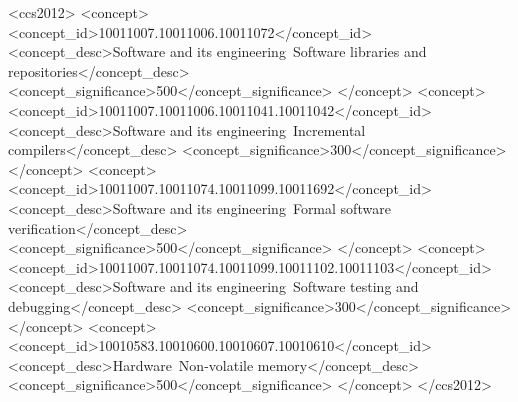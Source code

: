 \documentclass[sigconf]{acmart}
\theoremstyle{invar}
\begin{document}
\title{\papertitle}

\author{Morteza Hoseinzadeh}

\author{Steven Swanson}








\begin{CCSXML}
<ccs2012>
    <concept>
        <concept_id>10011007.10011006.10011072</concept_id>
        <concept_desc>Software and its engineering~Software libraries and repositories</concept_desc>
        <concept_significance>500</concept_significance>
        </concept>
    <concept>
        <concept_id>10011007.10011006.10011041.10011042</concept_id>
        <concept_desc>Software and its engineering~Incremental compilers</concept_desc>
        <concept_significance>300</concept_significance>
        </concept>
    <concept>
        <concept_id>10011007.10011074.10011099.10011692</concept_id>
        <concept_desc>Software and its engineering~Formal software verification</concept_desc>
        <concept_significance>500</concept_significance>
        </concept>
    <concept>
        <concept_id>10011007.10011074.10011099.10011102.10011103</concept_id>
        <concept_desc>Software and its engineering~Software testing and debugging</concept_desc>
        <concept_significance>300</concept_significance>
        </concept>
    <concept>
        <concept_id>10010583.10010600.10010607.10010610</concept_id>
        <concept_desc>Hardware~Non-volatile memory</concept_desc>
        <concept_significance>500</concept_significance>
        </concept>
  </ccs2012>
\end{CCSXML}
\end{document}
